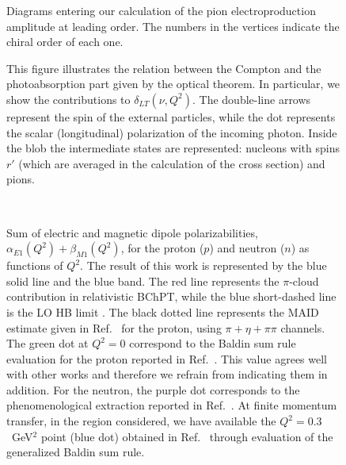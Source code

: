 \documentclass[twocolumn,prc,showpacs,nofootinbib,preprintnumbers,amsmath,amssymb,superscriptaddress]{revtex4-1}
\begin{document}
\begin{figure}
\begin{center}
\caption{Diagrams entering our calculation of the pion electroproduction amplitude at leading order. The numbers in the vertices indicate the chiral order of each one.\label{Fig:DiagsOp}}
\end{center}
\end{figure}

\begin{figure}
\begin{center}
\caption{This figure illustrates the relation between the Compton and the photoabsorption part given by the optical theorem. In particular, we show the contributions to $\delta_{LT}(\nu,Q^2)$. The double-line arrows represent the spin of the external particles, while the dot represents the scalar (longitudinal) polarization of the incoming photon. Inside the blob the intermediate states are represented: nucleons with spins $r'$ (which are averaged in the calculation of the cross section) and pions. \label{Fig:sigmaLT}}
\end{center}
\end{figure}

\begin{figure}[H]
\begin{center}
\hspace{-0.3cm} \\[0.5cm]
\hspace{-0.3cm} 
\caption{Sum of electric and magnetic dipole polarizabilities, $\alpha_{E1}(Q^2)+\beta_{M1}(Q^2)$, for the proton ($p$) and neutron ($n$) as functions of $Q^2$.  
The result of this work is represented by the blue solid line and the blue band. The red line represents the $\pi$-cloud contribution in relativistic BChPT, while the blue short-dashed line is the LO HB limit \cite{Nevado:2007dd}.
The black dotted line represents the MAID estimate \cite{Drechsel:2000ct,Drechsel:1998hk} given in Ref.~\cite{Drechsel:2002ar} for the proton, using $\pi+\eta+\pi\pi$ channels. The green dot at $Q^2=0$ correspond to the Baldin sum rule evaluation for the proton reported in Ref.~\cite{Gryniuk:2015}. This value agrees well with other works \cite{OlmosdeLeon:2001zn, Babusci:1997ij} and therefore we refrain from indicating them in addition. For the neutron, the purple dot corresponds to the phenomenological extraction reported in Ref.~\cite{Babusci:1997ij}.
At finite momentum transfer, in the region considered, we have available the $Q^2=0.3$~GeV$^2$ point (blue dot) obtained in Ref.~\cite{Liang:2004tk} through evaluation of the generalized Baldin sum rule. \label{Fig:alpha+betaplot}}
\end{center}
\end{figure}
\end{document}
